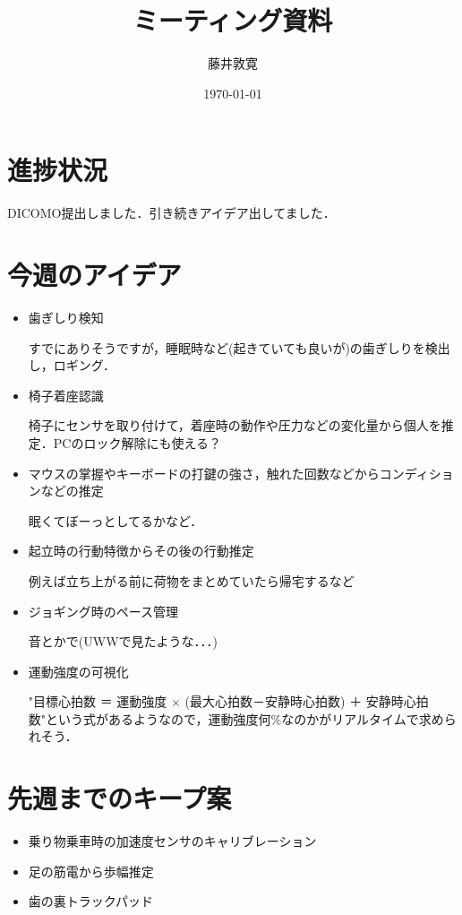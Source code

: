 \documentclass[a4j,twocolumn,10pt]{jarticle}
\title{ミーティング資料}
\author{藤井敦寛}
\date{\today}
\begin{document}
\maketitle

\section{進捗状況}
DICOMO提出しました．引き続きアイデア出してました．

\section{今週のアイデア}
\begin{itemize}
  \item 歯ぎしり検知

  すでにありそうですが，睡眠時など(起きていても良いが)の歯ぎしりを検出し，ロギング．

  \item 椅子着座認識

  椅子にセンサを取り付けて，着座時の動作や圧力などの変化量から個人を推定．PCのロック解除にも使える？

  \item マウスの掌握やキーボードの打鍵の強さ，触れた回数などからコンディションなどの推定

  眠くてぼーっとしてるかなど．

  \item 起立時の行動特徴からその後の行動推定

  例えば立ち上がる前に荷物をまとめていたら帰宅するなど

  \item ジョギング時のペース管理

  音とかで(UWWで見たような．．．)

  \item 運動強度の可視化
  
  "目標心拍数 ＝ 運動強度 × (最大心拍数－安静時心拍数) ＋ 安静時心拍数"という式があるようなので，運動強度何\%なのかがリアルタイムで求められそう．
\end{itemize}

\section{先週までのキープ案}
\begin{itemize}
  \item 乗り物乗車時の加速度センサのキャリブレーション
  \item 足の筋電から歩幅推定
  \item 歯の裏トラックパッド
\end{itemize}
\end{document}
